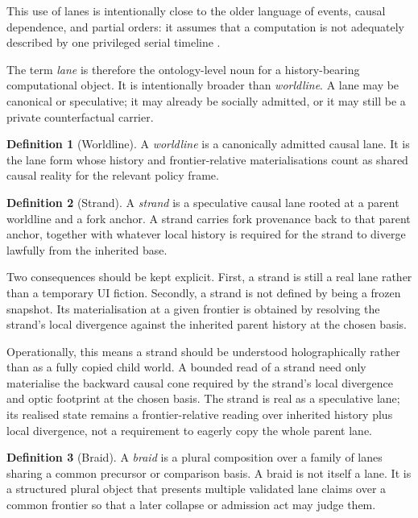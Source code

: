 \documentclass[11pt]{article}
\theoremstyle{definition}
\newtheorem{definition}{Definition}[section]
\theoremstyle{plain}
\theoremstyle{remark}
\begin{document}
This use of lanes is intentionally close to the older language of events, causal dependence, and partial orders: it assumes that a computation is not adequately described by one privileged serial timeline \cite{lamport1978time,winskel1986event}.

The term \emph{lane} is therefore the ontology-level noun for a history-bearing computational object. It is intentionally broader than \emph{worldline}. A lane may be canonical or speculative; it may already be socially admitted, or it may still be a private counterfactual carrier.

\begin{definition}[Worldline]
A \emph{worldline} is a canonically admitted causal lane. It is the lane form whose history and frontier-relative materialisations count as shared causal reality for the relevant policy frame.
\end{definition}

\begin{definition}[Strand]
A \emph{strand} is a speculative causal lane rooted at a parent worldline and a fork anchor. A strand carries fork provenance back to that parent anchor, together with whatever local history is required for the strand to diverge lawfully from the inherited base.
\end{definition}

Two consequences should be kept explicit. First, a strand is still a real lane rather than a temporary UI fiction. Secondly, a strand is not defined by being a frozen snapshot. Its materialisation at a given frontier is obtained by resolving the strand's local divergence against the inherited parent history at the chosen basis.

Operationally, this means a strand should be understood holographically rather
than as a fully copied child world. A bounded read of a strand need only
materialise the backward causal cone required by the strand's local divergence
and optic footprint at the chosen basis. The strand is real as a speculative
lane; its realised state remains a frontier-relative reading over inherited
history plus local divergence, not a requirement to eagerly copy the whole
parent lane.

\begin{definition}[Braid]
A \emph{braid} is a plural composition over a family of lanes sharing a common precursor or comparison basis. A braid is not itself a lane. It is a structured plural object that presents multiple validated lane claims over a common frontier so that a later collapse or admission act may judge them.
\end{definition}
\end{document}
